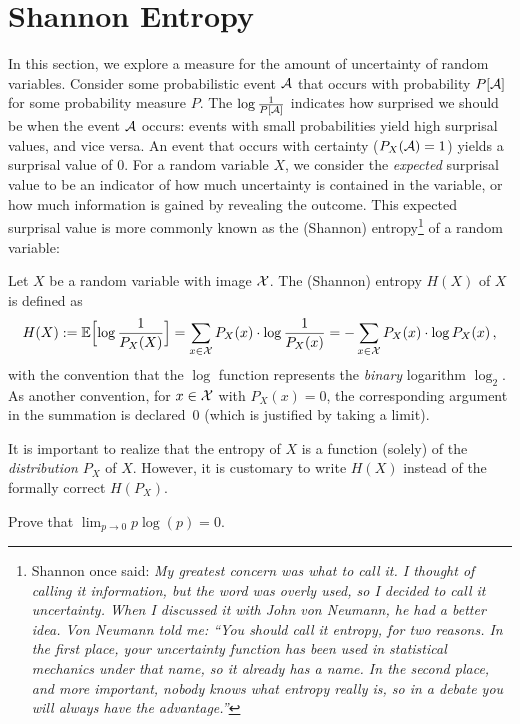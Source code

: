 \section{Shannon Entropy}
In this section, we explore a measure for the amount of uncertainty of random variables. Consider some probabilistic event $\mathcal{A}$ that occurs with probability $P[\mathcal{A}]$ for some probability measure $P$. The  $\log \frac{1}{P[\mathcal{A}]}$ indicates how surprised we should be when the event $\mathcal{A}$ occurs: events with small probabilities yield high surprisal values, and vice versa. An event that occurs with certainty ($P_X(\mathcal{A}) = 1$) yields a surprisal value of 0. For a random variable $X$, we consider the {\em expected} surprisal value to be an indicator of how much uncertainty is contained in the variable, or how much information is gained by revealing the outcome. This expected surprisal value is more commonly known as the (Shannon) entropy\footnote{Shannon once said: \it My greatest concern was what to call it. I thought of calling it {\em information}, but the word was overly used, so I decided to call it {\em uncertainty}. When I discussed it with John von Neumann, he had a better idea. Von Neumann told me: ``You should call it {\em entropy}, for two reasons. In the first place, your uncertainty function has been used in statistical mechanics under that name, so it already has a name. In the second place, and more important, nobody knows what entropy really is, so in a debate you will always have the advantage.''  } of a random variable:

\begin{definition}[Entropy]\label{def:entropy}
Let $X$ be a random variable with image ${\cal X}$. The
(Shannon) entropy $H(X)$ of $X$ is defined as
\[
H(X) := \mathbb{E}\Bigl[\log\frac{1}{P_X(X)}\Bigr] = \sum_{x\in {\cal X}} P_X(x) \cdot \log \frac{1}{P_X(x)} = -\sum_{x\in {\cal X}} P_X(x) \cdot \log P_X(x) \, ,
\]
with the convention that the $\log$ function represents the {\em binary} logarithm $\log_2$. As another convention, for $x \in  \cal X$ with $P_X(x) = 0$, the corresponding argument in the summation is declared~$0$ (which is justified by
taking a limit).%
\end{definition}
%
It is important to realize that the entropy of $X$ is a function (solely) of the {\em distribution} $P_X$ of $X$. However, it is customary to write $H(X)$ instead of the formally correct $H(P_X)$. 

\begin{exercise}
Prove that $\lim_{p \rightarrow 0} p \log(p) = 0$.
\end{exercise}

